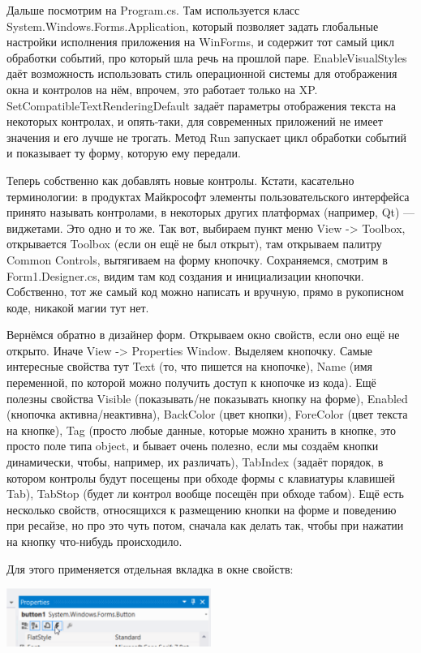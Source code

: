 \documentclass[a5paper]{article}
\begin{document}
Дальше посмотрим на Program.cs. Там используется класс System.Windows.Forms.Application, который позволяет задать глобальные настройки исполнения приложения на WinForms, и содержит тот самый цикл обработки событий, про который шла речь на прошлой паре. EnableVisualStyles даёт возможность использовать стиль операционной системы для отображения окна и контролов на нём, впрочем, это работает только на XP. SetCompatibleTextRenderingDefault задаёт параметры отображения текста на некоторых контролах, и опять-таки, для современных приложений не имеет значения и его лучше не трогать. Метод Run запускает цикл обработки событий и показывает ту форму, которую ему передали.

Теперь собственно как добавлять новые контролы. Кстати, касательно терминологии: в продуктах Майкрософт элементы пользовательского интерфейса принято называть контролами, в некоторых других платформах (например, Qt) --- виджетами. Это одно и то же. Так вот, выбираем пункт меню View -> Toolbox, открывается Toolbox (если он ещё не был открыт), там открываем палитру Common Controls, вытягиваем на форму кнопочку. Сохраняемся, смотрим в Form1.Designer.cs, видим там код создания и инициализации кнопочки. Собственно, тот же самый код можно написать и вручную, прямо в рукописном коде, никакой магии тут нет. 

Вернёмся обратно в дизайнер форм. Открываем окно свойств, если оно ещё не открыто. Иначе View -> Properties Window. Выделяем кнопочку. Самые интересные свойства тут Text (то, что пишется на кнопочке), Name (имя переменной, по которой можно получить доступ к кнопочке из кода). Ещё полезны свойства Visible (показывать/не показывать кнопку на форме), Enabled (кнопочка активна/неактивна), BackColor (цвет кнопки), ForeColor (цвет текста на кнопке), Tag (просто любые данные, которые можно хранить в кнопке, это просто поле типа object, и бывает очень полезно, если мы создаём кнопки динамически, чтобы, например, их различать), TabIndex (задаёт порядок, в котором контролы будут посещены при обходе формы с клавиатуры клавишей Tab), TabStop (будет ли контрол вообще посещён при обходе табом). Ещё есть несколько свойств, относящихся к размещению кнопки на форме и поведению при ресайзе, но про это чуть потом, сначала как делать так, чтобы при нажатии на кнопку что-нибудь происходило.

Для этого применяется отдельная вкладка в окне свойств:

\begin{center}
    \includegraphics[width=0.5\textwidth]{events.png}
\end{center}
\end{document}
